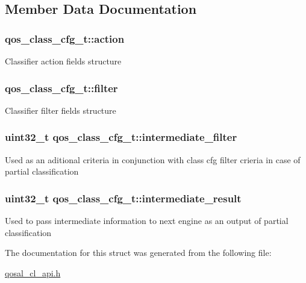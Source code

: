 \subsection{Member Data Documentation}
\hypertarget{structqos__class__cfg__t_a81b6665d9574605d4a350abf8f073dd2}{
\subsubsection[{action}]{ qos\-\_\-class\-\_\-cfg\-\_\-t\-::action}}\label{structqos__class__cfg__t_a81b6665d9574605d4a350abf8f073dd2}
Classifier action fields structure \hypertarget{structqos__class__cfg__t_a50dc761ffcaa6824d69e2be6d451b711}{
\subsubsection[{filter}]{ qos\-\_\-class\-\_\-cfg\-\_\-t\-::filter}}\label{structqos__class__cfg__t_a50dc761ffcaa6824d69e2be6d451b711}
Classifier filter fields structure \hypertarget{structqos__class__cfg__t_a11bf1df252c41444ac62c6f3317bf8b6}{
\subsubsection[{intermediate\-\_\-filter}]{\setlength{\rightskip}{0pt plus 5cm}uint32\-\_\-t qos\-\_\-class\-\_\-cfg\-\_\-t\-::intermediate\-\_\-filter}}\label{structqos__class__cfg__t_a11bf1df252c41444ac62c6f3317bf8b6}
Used as an aditional criteria in conjunction with class cfg filter crieria in case of partial classification \hypertarget{structqos__class__cfg__t_a3b386c0054684059ff75ab6a61627d25}{
\subsubsection[{intermediate\-\_\-result}]{\setlength{\rightskip}{0pt plus 5cm}uint32\-\_\-t qos\-\_\-class\-\_\-cfg\-\_\-t\-::intermediate\-\_\-result}}\label{structqos__class__cfg__t_a3b386c0054684059ff75ab6a61627d25}
Used to pass intermediate information to next engine as an output of partial classification 

The documentation for this struct was generated from the following file\-:\begin{DoxyCompactItemize}
\item 
\hyperlink{qosal__cl__api_8h}{qosal\-\_\-cl\-\_\-api.\-h}\end{DoxyCompactItemize}

